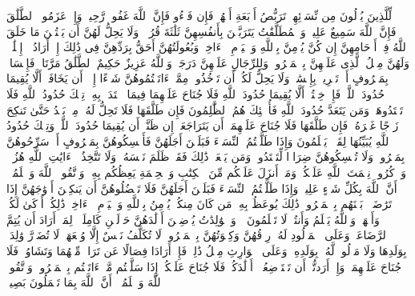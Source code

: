 \stopbuffer
\startbuffer[\q:2:226]
لِّلَّذِینَ یُؤۡلُونَ مِن نِّسَاۤئِهِمۡ تَرَبُّصُ أَرۡبَعَةِ أَشۡهُرࣲۖ فَإِن فَاۤءُو فَإِنَّ ٱللَّهَ غَفُورࣱ رَّحِیمࣱ%
\stopbuffer
\startbuffer[\q:2:227]
وَإِنۡ عَزَمُوا۟ ٱلطَّلَٰقَ فَإِنَّ ٱللَّهَ سَمِیعٌ عَلِیمࣱ%
\stopbuffer
\startbuffer[\q:2:228]
وَٱلۡمُطَلَّقَٰتُ یَتَرَبَّصۡنَ بِأَنفُسِهِنَّ ثَلَٰثَةَ قُرُوۤءࣲۚ وَلَا یَحِلُّ لَهُنَّ أَن یَكۡتُمۡنَ مَا خَلَقَ ٱللَّهُ فِیۤ أَرۡحَامِهِنَّ إِن كُنَّ یُؤۡمِنَّ بِٱللَّهِ وَٱلۡیَوۡمِ ٱلۡءَاخِرِۚ وَبُعُولَتُهُنَّ أَحَقُّ بِرَدِّهِنَّ فِی ذَٰلِكَ إِنۡ أَرَادُوۤا۟ إِصۡلَٰحࣰاۚ وَلَهُنَّ مِثۡلُ ٱلَّذِی عَلَیۡهِنَّ بِٱلۡمَعۡرُوفِۚ وَلِلرِّجَالِ عَلَیۡهِنَّ دَرَجَةࣱۗ وَٱللَّهُ عَزِیزٌ حَكِیمٌ%
\stopbuffer
\startbuffer[\q:2:229]
ٱلطَّلَٰقُ مَرَّتَانِۖ فَإِمۡسَاكُۢ بِمَعۡرُوفٍ أَوۡ تَسۡرِیحُۢ بِإِحۡسَٰنࣲۗ وَلَا یَحِلُّ لَكُمۡ أَن تَأۡخُذُوا۟ مِمَّاۤ ءَاتَیۡتُمُوهُنَّ شَیۡءًا إِلَّاۤ أَن یَخَافَاۤ أَلَّا یُقِیمَا حُدُودَ ٱللَّهِۖ فَإِنۡ خِفۡتُمۡ أَلَّا یُقِیمَا حُدُودَ ٱللَّهِ فَلَا جُنَاحَ عَلَیۡهِمَا فِیمَا ٱفۡتَدَتۡ بِهِۦۗ تِلۡكَ حُدُودُ ٱللَّهِ فَلَا تَعۡتَدُوهَاۚ وَمَن یَتَعَدَّ حُدُودَ ٱللَّهِ فَأُو۟لَٰۤئِكَ هُمُ ٱلظَّٰلِمُونَ%
\stopbuffer
\startbuffer[\q:2:230]
فَإِن طَلَّقَهَا فَلَا تَحِلُّ لَهُۥ مِنۢ بَعۡدُ حَتَّىٰ تَنكِحَ زَوۡجًا غَیۡرَهُۥۗ فَإِن طَلَّقَهَا فَلَا جُنَاحَ عَلَیۡهِمَاۤ أَن یَتَرَاجَعَاۤ إِن ظَنَّاۤ أَن یُقِیمَا حُدُودَ ٱللَّهِۗ وَتِلۡكَ حُدُودُ ٱللَّهِ یُبَیِّنُهَا لِقَوۡمࣲ یَعۡلَمُونَ%
\stopbuffer
\startbuffer[\q:2:231]
وَإِذَا طَلَّقۡتُمُ ٱلنِّسَاۤءَ فَبَلَغۡنَ أَجَلَهُنَّ فَأَمۡسِكُوهُنَّ بِمَعۡرُوفٍ أَوۡ سَرِّحُوهُنَّ بِمَعۡرُوفࣲۚ وَلَا تُمۡسِكُوهُنَّ ضِرَارࣰا لِّتَعۡتَدُوا۟ۚ وَمَن یَفۡعَلۡ ذَٰلِكَ فَقَدۡ ظَلَمَ نَفۡسَهُۥۚ وَلَا تَتَّخِذُوۤا۟ ءَایَٰتِ ٱللَّهِ هُزُوࣰاۚ وَٱذۡكُرُوا۟ نِعۡمَتَ ٱللَّهِ عَلَیۡكُمۡ وَمَاۤ أَنزَلَ عَلَیۡكُم مِّنَ ٱلۡكِتَٰبِ وَٱلۡحِكۡمَةِ یَعِظُكُم بِهِۦۚ وَٱتَّقُوا۟ ٱللَّهَ وَٱعۡلَمُوۤا۟ أَنَّ ٱللَّهَ بِكُلِّ شَیۡءٍ عَلِیمࣱ%
\stopbuffer
\startbuffer[\q:2:232]
وَإِذَا طَلَّقۡتُمُ ٱلنِّسَاۤءَ فَبَلَغۡنَ أَجَلَهُنَّ فَلَا تَعۡضُلُوهُنَّ أَن یَنكِحۡنَ أَزۡوَٰجَهُنَّ إِذَا تَرَٰضَوۡا۟ بَیۡنَهُم بِٱلۡمَعۡرُوفِۗ ذَٰلِكَ یُوعَظُ بِهِۦ مَن كَانَ مِنكُمۡ یُؤۡمِنُ بِٱللَّهِ وَٱلۡیَوۡمِ ٱلۡءَاخِرِۗ ذَٰلِكُمۡ أَزۡكَىٰ لَكُمۡ وَأَطۡهَرُۚ وَٱللَّهُ یَعۡلَمُ وَأَنتُمۡ لَا تَعۡلَمُونَ%
\stopbuffer
\startbuffer[\q:2:233]
۞ وَٱلۡوَٰلِدَٰتُ یُرۡضِعۡنَ أَوۡلَٰدَهُنَّ حَوۡلَیۡنِ كَامِلَیۡنِۖ لِمَنۡ أَرَادَ أَن یُتِمَّ ٱلرَّضَاعَةَۚ وَعَلَى ٱلۡمَوۡلُودِ لَهُۥ رِزۡقُهُنَّ وَكِسۡوَتُهُنَّ بِٱلۡمَعۡرُوفِۚ لَا تُكَلَّفُ نَفۡسٌ إِلَّا وُسۡعَهَاۚ لَا تُضَاۤرَّ وَٰلِدَةُۢ بِوَلَدِهَا وَلَا مَوۡلُودࣱ لَّهُۥ بِوَلَدِهِۦۚ وَعَلَى ٱلۡوَارِثِ مِثۡلُ ذَٰلِكَۗ فَإِنۡ أَرَادَا فِصَالًا عَن تَرَاضࣲ مِّنۡهُمَا وَتَشَاوُرࣲ فَلَا جُنَاحَ عَلَیۡهِمَاۗ وَإِنۡ أَرَدتُّمۡ أَن تَسۡتَرۡضِعُوۤا۟ أَوۡلَٰدَكُمۡ فَلَا جُنَاحَ عَلَیۡكُمۡ إِذَا سَلَّمۡتُم مَّاۤ ءَاتَیۡتُم بِٱلۡمَعۡرُوفِۗ وَٱتَّقُوا۟ ٱللَّهَ وَٱعۡلَمُوۤا۟ أَنَّ ٱللَّهَ بِمَا تَعۡمَلُونَ بَصِیرࣱ%
